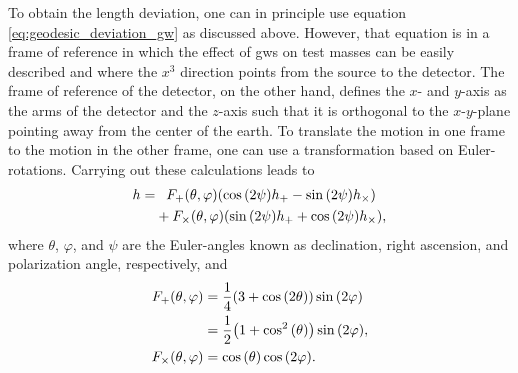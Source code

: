 To obtain the length deviation, one can in principle use equation \eqref{eq:geodesic_deviation_gw} as discussed above. However, that equation is in a frame of reference in which the effect of \acrshort{gw}s on test masses can be easily described and where the $x^3$ direction points from the source to the detector. The frame of reference of the detector, on the other hand, defines the $x$- and $y$-axis as the arms of the detector and the $z$-axis such that it is orthogonal to the $x$-$y$-plane pointing away from the center of the earth. To translate the motion in one frame to the motion in the other frame, one can use a transformation based on Euler-rotations. Carrying out these calculations leads to~\cite{Schutz:2011tw}
\begin{align}\label{eq:delta_l}
h = & \phantom{+}F_+{\left( \theta, \varphi \right)}{\left( \cos{\left( 2\psi \right)}h_+ - \sin{\left( 2\psi \right)} h_\times \right)}\nonumber\\
& + F_\times{\left( \theta, \varphi \right)}{\left( \sin{\left( 2\psi \right)}h_+ + \cos{\left( 2\psi \right)} h_\times \right)},
\end{align}
where $\theta$, $\varphi$, and $\psi$ are the Euler-angles known as declination, right ascension, and polarization angle, respectively, and
\begin{align}\label{eq:antenna_patterns}
F_+{\left( \theta, \varphi \right)} & = \frac{1}{4}{\left( 3+\cos{\left( 2\theta \right)} \right)}\sin{\left( 2\varphi \right)}\nonumber\\
& = \frac{1}{2}{\left( 1 + \cos^2{\left( \theta \right)} \right)}\sin{\left( 2\varphi \right)},\nonumber\\
F_\times{\left( \theta, \varphi \right)} & = \cos{\left( \theta \right)}\cos{\left( 2\varphi \right)}.
\end{align}

